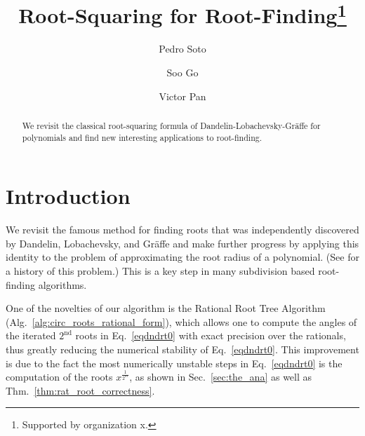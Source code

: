 \documentclass[runningheads]{llncs}
\begin{document}
%
\title{Root-Squaring for Root-Finding\thanks{Supported by organization x.}}
%
%
\author{Pedro Soto \and
Soo Go \and
Victor Pan}
%
%
%
\maketitle              %
%
\begin{abstract}
We revisit the classical root-squaring formula of Dandelin-Lobachevsky-Gr{\"a}ffe for polynomials and find new interesting applications to root-finding.

\end{abstract}
%
%
%
\section{Introduction}

We revisit the famous method for finding roots that was independently discovered by Dandelin, Lobachevsky, and Gr{\"a}ffe and make further progress by applying this identity to the problem of approximating the root radius of a polynomial. (See \cite{10.2307/2310626} for a history of this problem.)
This is a key step in many subdivision based root-finding algorithms.

One of the novelties of our algorithm is the Rational Root Tree Algorithm (Alg.~\ref{alg:circ_roots_rational_form}), which allows one to compute the angles of the iterated $2^\mathrm{nd}$ roots in Eq.~\ref{eqdndrt0} with exact precision over the rationals, thus greatly reducing the numerical stability of Eq.~\ref{eqdndrt0}. This improvement is due to the fact the most numerically unstable steps in Eq.~\ref{eqdndrt0} is the computation of the roots $x^{\frac{1}{2^m}}$, as shown in Sec.~\ref{sec:the_ana} as well as Thm.~\ref{thm:rat_root_correctness}.
\end{document}
